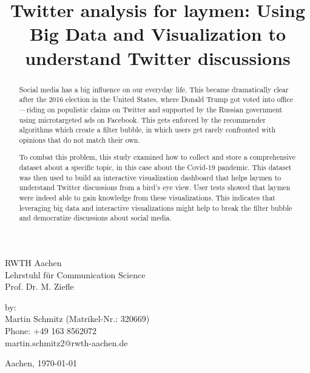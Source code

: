 \documentclass[a4, 12pt]{article}
\title{Twitter analysis for laymen: Using Big Data and Visualization to understand Twitter discussions}\let\Title\@title     %
\begin{document}


\begin{titlepage}
    
    \large
    RWTH Aachen\\
    Lehrstuhl für Communication Science\\
    Prof. Dr. M. Ziefle
    
    \vspace{5cm}
    \Large
    \doublespacing{
        \textit{Master thesis\\}
        \textbf{\Title}
    }
    
    \vspace{7cm}
    \normalsize
    by:\\
    Martin Schmitz (Matrikel-Nr.: 320669)\\
    Phone: +49 163 8562072\\
    martin.schmitz2@rwth-aachen.de
    
    \vfill
    
    Aachen, \today    
\afterpage{\cfoot{\textcolor{hgray}{\thepage}}}
        
\end{titlepage}


\begin{abstract}
    Social media has a big influence on our everyday life. This became dramatically clear after the 2016 election in the United States, where Donald Trump got voted into office---riding on populistic claims on Twitter and supported by the Russian government using microtargeted ads on Facebook. This gets enforced by the recommender algorithms which create a filter bubble, in which users get rarely confronted with opinions that do not match their own.

    To combat this problem, this study examined how to collect and store a comprehensive dataset about a specific topic, in this case about the Covid-19 pandemic. This dataset was then used to build an interactive visualization dashboard that helps laymen to understand Twitter discussions from a bird's eye view. User tests showed that laymen were indeed able to gain knowledge from these visualizations. This indicates that leveraging big data and interactive visualizations might help to break the filter bubble and democratize discussions about social media.
\end{abstract}
\end{document}
